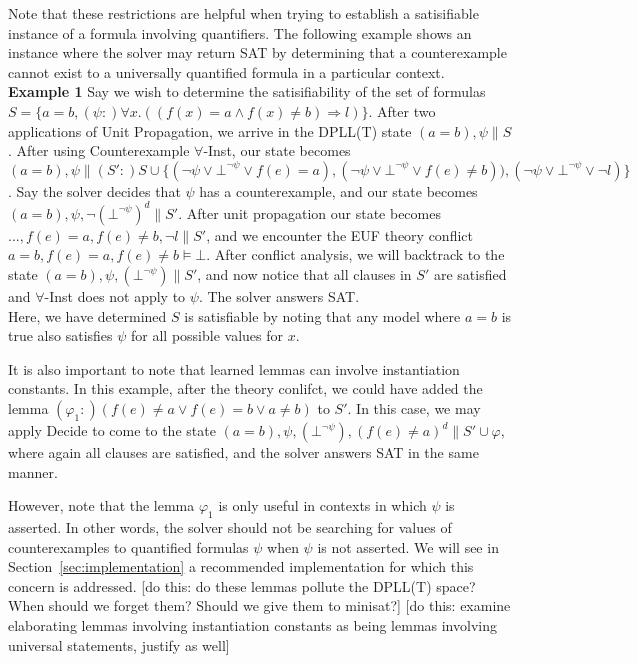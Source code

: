 \documentclass{llncs}
\begin{document}
Note that these restrictions are helpful when trying to establish a satisifiable instance of a formula involving quantifiers.
The following example shows an instance where the solver may return SAT by determining that a counterexample cannot exist to a universally quantified formula in a particular context. \\

{\bf Example 1}
Say we wish to determine the satisifiability of the set of formulas $S = \{ a = b, (\psi :) \forall x. ((f(x) = a \wedge f(x) \neq b) \Rightarrow l) \}$.
After two applications of Unit Propagation, we arrive in the DPLL(T) state $( a = b ), \psi \parallel S$.
After using Counterexample $\forall$-Inst, our state becomes $( a = b ), \psi \parallel (S':) S \cup \{ (\neg \psi \vee \bot^{\neg \psi} \vee f( e ) = a), (\neg \psi \vee \bot^{\neg \psi} \vee f( e ) \neq b)), (\neg \psi \vee \bot^{\neg \psi} \vee \neg l) \}$.
Say the solver decides that $\psi$ has a counterexample, and our state becomes $( a = b ), \psi, \neg (\bot^{\neg \psi})^d \parallel S'$. 
After unit propagation our state becomes $\ldots, f( e ) = a, f( e ) \neq b, \neg l \parallel S'$, and we encounter the EUF theory conflict $a = b, f( e ) = a, f( e ) \neq b \models \bot$.
After conflict analysis, we will backtrack to the state $( a = b ), \psi, (\bot^{\neg \psi}) \parallel S'$, and now notice that all clauses in $S'$ are satisfied and $\forall$-Inst does not apply to $\psi$.
The solver answers SAT. \\

Here, we have determined $S$ is satisfiable by noting that any model where $a = b$ is true also satisfies $\psi$ for all possible values for $x$.

It is also important to note that learned lemmas can involve instantiation constants.
In this example, after the theory conlifct, we could have added the lemma $(\varphi_1 : ) ( f( e ) \neq a \vee f( e ) = b \vee a \neq b )$ to $S'$.
In this case, we may apply Decide to come to the state $( a = b ), \psi, (\bot^{\neg \psi}), (f( e ) \neq a)^d \parallel S' \cup \varphi$, where again all clauses are satisfied, and the solver answers SAT in the same manner.

However, note that the lemma $\varphi_1$ is only useful in contexts in which $\psi$ is asserted.
In other words, the solver should not be searching for values of counterexamples to quantified formulas $\psi$ when $\psi$ is not asserted.
We will see in Section~\ref{sec:implementation} a recommended implementation for which this concern is addressed.
[do this: do these lemmas pollute the DPLL(T) space?  When should we forget them?  Should we give them to minisat?]
[do this: examine elaborating lemmas involving instantiation constants as being lemmas involving universal statements, justify as well]
\end{document}

